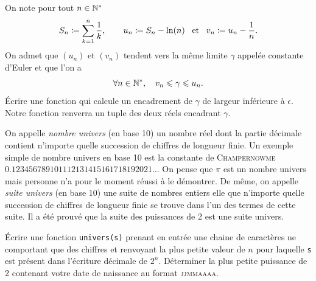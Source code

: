 \documentclass{magnolia}
\begin{document}


On note pour tout $n \in {\mathbb{N}^*}$
\[S_n\coloneqq \sum_{k=1}^{n} \frac{1}{k},\qquad
	u_n\coloneqq S_n-\ln(n) \quad\!\text{et}\quad\! v_n\coloneqq u_n-\frac{1}{n}.\] 
On admet que $(u_n)$ et $(v_n)$ tendent vers la même limite $\gamma$ appelée constante
d'Euler et que l'on a
\[\forall n \in{\mathbb{N}^*} ,\quad v_n \leqslant \gamma \leqslant u_n.\]
Écrire une fonction qui calcule un encadrement de $\gamma$ de largeur inférieure à $\epsilon$.
Notre fonction renverra un tuple des deux réels encadrant $\gamma$.



On appelle \emph{nombre univers} (en base 10) un nombre réel dont la partie décimale contient
n'importe quelle succession de chiffres de longueur finie. Un exemple simple de nombre
univers en base 10 est la constante de \textsc{Champernowme} $0.123456789101112131415161718192021\ldots$ On pense que $\pi$ est un nombre univers mais
personne n'a pour le moment réussi à le démontrer. De même, on appelle \emph{suite univers} (en base 10) une suite de nombres entiers elle que n'importe quelle succession de chiffres
de longueur finie se trouve dans l'un des termes de cette suite. Il a été prouvé que la
suite des puissances de 2 est une suite univers.
\begin{questions}
\question Écrire une fonction \verb!univers(s)! prenant en entrée une chaine de caractères
  ne comportant que des chiffres et renvoyant la plus petite valeur de $n$ pour laquelle
	\verb!s! est présent dans l'écriture décimale de $2^n$.
\question Déterminer la plus petite puissance de 2 contenant votre date de naissance
  au format \textsc{jjmmaaaa}.
\end{questions}
\end{document}
